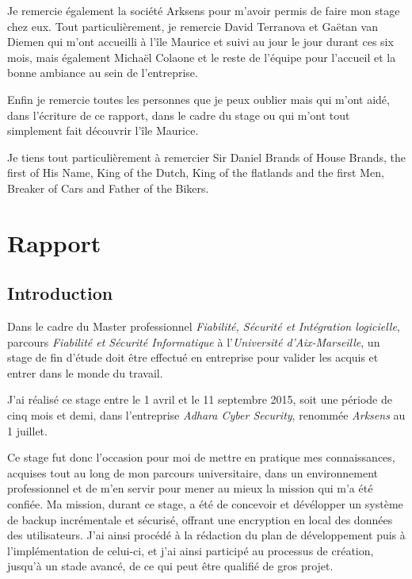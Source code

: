 \documentclass[a4paper,10pt, twoside]{report}
\begin{document}
\begin{spacing}{1.2}
Je remercie également la société Arksens pour m'avoir permis de faire mon
stage chez eux. Tout particulièrement, je remercie David Terranova et Gaëtan
van Diemen qui m'ont accueilli à l'île Maurice et suivi au jour le jour
durant ces six mois, mais également Michaël Colaone et le reste de
l'équipe pour l'accueil et la bonne ambiance au sein de l'entreprise.

Enfin je remercie toutes les personnes que je peux oublier mais qui m'ont
aidé, dans l'écriture de ce rapport, dans le cadre du stage ou qui m'ont
tout simplement fait découvrir l'île Maurice.

Je tiens tout particulièrement à remercier Sir Daniel Brands of House Brands,
the first of His Name, King of the Dutch, King of the flatlands and the first
Men, Breaker of Cars and Father of the Bikers.

\clearpage
\pagestyle{fancy}
\tableofcontents
\clearpage

\part{Rapport}
\thispagestyle{empty}
\chapter{Introduction}
\thispagestyle{fancy}
Dans le cadre du Master professionnel \textit{Fiabilité, Sécurité et
Intégration logicielle}, parcours \textit{Fiabilité et Sécurité
Informatique} à l'\textit{Université d'Aix-Marseille}, un stage de fin
d'étude doit être effectué en entreprise pour valider les acquis et
entrer dans le monde du travail.

J'ai réalisé ce stage entre le 1 avril et le 11 septembre 2015, soit
une période de cinq mois et demi, dans l'entreprise \textit{Adhara Cyber
Security}, renommée \textit{Arksens} au 1 juillet.

Ce stage fut donc l'occasion pour moi de mettre en pratique mes connaissances,
acquises tout au long de mon parcours universitaire, dans un environnement
professionnel et de m'en servir pour mener au mieux la mission qui m'a
été confiée. Ma mission, durant ce stage, a été de concevoir et
dévélopper un système de backup incrémentale et sécurisé, offrant
une encryption en local des données des utilisateurs. J'ai ainsi procédé
à la rédaction du plan de développement puis à l'implémentation de
celui-ci, et j'ai ainsi participé au processus de création, jusqu'à un
stade avancé, de ce qui peut être qualifié de gros projet.


\end{spacing}
\end{document}
